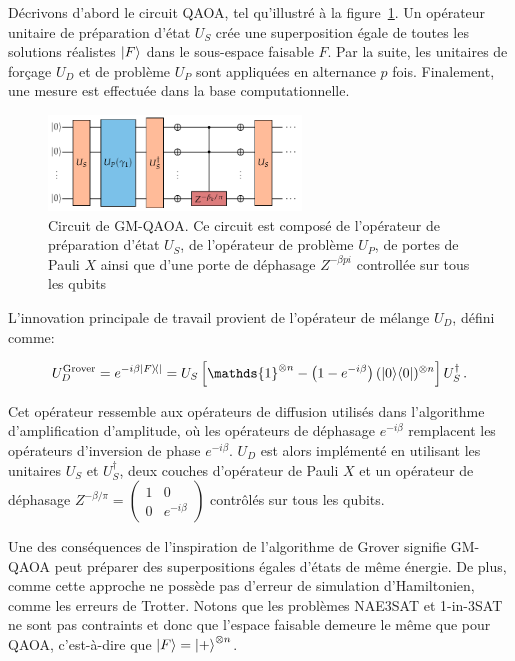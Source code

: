 Décrivons d'abord le circuit QAOA, tel qu'illustré à la figure~\ref{fig:gm-qaoa}. Un opérateur unitaire de préparation d'état $U_{S}$ crée une superposition égale de toutes les solutions réalistes $\ket{F}$ dans le sous-espace faisable $F$. Par la suite, les unitaires de forçage $U_{D}$ et de problème $U_{P}$ sont appliquées en alternance $p$ fois. Finalement, une mesure est effectuée dans la base computationnelle.

\begin{figure}[ht!]
    \centering
    \includegraphics[width=0.6\textwidth]{figures/gm-qaoa}
    \caption[Circuit de l'ansatz quantique à opérateurs alternants avec forçage de Grover]{Circuit de GM-QAOA. Ce circuit est composé de l'opérateur de préparation d'état $U_{S}$, de l'opérateur de problème $U_{P}$, de portes de Pauli $X$ ainsi que d'une porte de déphasage $Z^{-\beta pi}$ controllée sur tous les qubits}
    \label{fig:gm-qaoa}
\end{figure}

L'innovation principale de travail provient de l'opérateur de mélange $U_{D}$, défini comme:

\begin{equation}
    U_D^{\mathrm{Grover}} = e^{-i \beta \ket{F}\!\bra{}} = U_{S}\left[ \mathds{1}^{\otimes n} -\left(1-e^{-i \beta}\right) (\ket{0}\!\bra{0})^{\otimes n} \right] U_{S}^{\dagger} \,.
\end{equation}

Cet opérateur ressemble aux opérateurs de diffusion utilisés dans l'algorithme d'amplification d'amplitude, où les opérateurs de déphasage $e^{-i\beta}$ remplacent les opérateurs d'inversion de phase $e^{-i\beta}$. $U_{D}$ est alors implémenté en utilisant les unitaires $U_{S}$ et $U_{S}^{\dagger}$, deux couches d'opérateur de Pauli $X$ et un opérateur de déphasage $Z^{-\beta/\pi} = \begin{pmatrix}
1 & 0 \\
0 & e^{-i\beta}
\end{pmatrix}$ contrôlés sur tous les qubits.

Une des conséquences de l'inspiration de l'algorithme de Grover signifie GM-QAOA peut préparer des superpositions égales d'états de même énergie. De plus, comme cette approche ne possède pas d'erreur de simulation d'Hamiltonien, comme les erreurs de Trotter. Notons que les problèmes NAE3SAT et 1-in-3SAT ne sont pas contraints et donc que l'espace faisable demeure le même que pour QAOA, c'est-à-dire que $\ket{F} = \ket{+}^{\otimes n}$.

